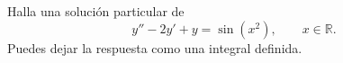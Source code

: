 Halla una solución particular de
\[y''-2y'+y=\sin(x^2),\qquad x\in\mathbb R.\]
Puedes dejar la respuesta como una integral definida.
